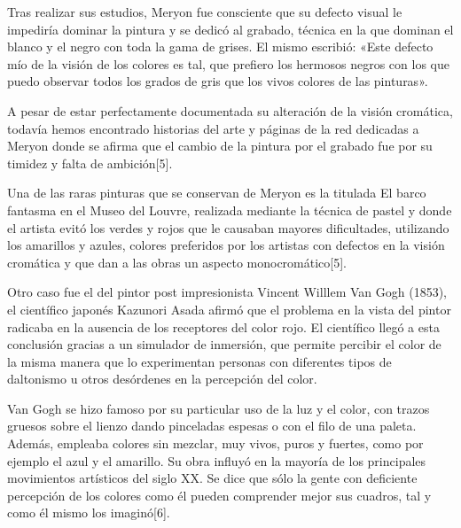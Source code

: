 \documentclass[10pt]{article}
\begin{document}
\setlength{\parskip}{2mm}

Tras realizar sus estudios, Meryon fue consciente que su defecto visual le impediría dominar la pintura y se dedicó al grabado, técnica en la que dominan el blanco y el negro con toda la gama de grises. El mismo escribió: «Este defecto mío de la visión de los colores es tal, que prefiero los hermosos negros con los que puedo observar todos los grados de gris que los vivos colores de las pinturas».

\setlength{\parskip}{2mm}

A pesar de estar perfectamente documentada su alteración de la visión cromática, todavía hemos encontrado historias del arte y páginas de la red dedicadas a Meryon donde se afirma que el cambio de la pintura por el grabado fue por su timidez y falta de ambición[5].

\setlength{\parskip}{2mm}

Una de las raras pinturas que se conservan de Meryon es la titulada El barco fantasma en el Museo del Louvre, realizada mediante la técnica de pastel y donde el artista evitó los verdes y rojos que le causaban mayores dificultades, utilizando los amarillos y azules, colores preferidos por los artistas con defectos en la visión cromática y que dan a las obras un aspecto monocromático[5].

\setlength{\parskip}{2mm}

Otro caso fue el del  pintor post impresionista Vincent Willlem Van Gogh (1853), el científico japonés Kazunori Asada afirmó que el problema en la vista del pintor radicaba en la ausencia de los receptores del color rojo. El científico llegó a esta conclusión gracias a un simulador de inmersión, que permite percibir el color de la misma manera que lo experimentan personas con diferentes tipos de daltonismo u otros desórdenes en la percepción del color.

\setlength{\parskip}{2mm}

Van Gogh se hizo famoso por su particular uso de la luz y el color, con trazos gruesos sobre el lienzo dando pinceladas espesas o con el filo de una paleta. Además, empleaba colores sin mezclar, muy vivos, puros y fuertes, como por ejemplo el azul y el amarillo. Su obra influyó en la mayoría de los principales movimientos artísticos del siglo XX. Se dice que sólo la gente con deficiente percepción de los colores como él pueden comprender mejor sus cuadros, tal y como él mismo los imaginó[6].

\setlength{\parskip}{2mm}
\end{document}
